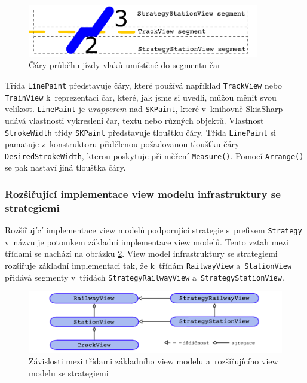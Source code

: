 \begin{figure}[!hbt]
	\includegraphics[width=0.9\textwidth]{../img/kap4_trackline_measure_solution}
	\caption{Čáry průběhu jízdy vlaků umístěné do segmentu čar}
	\label{fig:kap4:gttg-model-track-segments-solution}
\end{figure}

Třída \texttt{LinePaint} představuje čáry, které používá například \texttt{TrackView} nebo \texttt{TrainView} k~reprezentaci čar, které, jak jsme si uvedli, můžou měnit svou velikost. \texttt{LinePaint} je \textit{wrapperem} nad \texttt{SKPaint}, které v~knihovně SkiaSharp udává vlastnosti vykreslení čar, textu nebo různých objektů. Vlastnost \texttt{StrokeWidth} třídy \texttt{SKPaint} představuje tloušťku čáry. Třída \texttt{LinePaint} si pamatuje z~konstruktoru přidělenou požadovanou tloušťku čáry \texttt{DesiredStrokeWidth}, kterou poskytuje při měření \texttt{Measure()}. Pomocí \texttt{Arrange()} se pak nastaví jiná tloušťka čáry.

\subsubsection*{Rozšiřující implementace view modelu infrastruktury se strategiemi}
Rozšiřující implementace view modelů podporující strategie s~prefixem \linebreak \texttt{Strategy} v~názvu je potomkem základní implementace view modelů. Tento vztah mezi třídami se nachází na obrázku \ref{fig:kap4:gttg-core-view-model-diagram}. View model infrastruktury se strategiemi rozšiřuje základní implementaci tak, že k~třídám \texttt{RailwayView} a~\texttt{StationView} přidává segmenty v~třídách \texttt{StrategyRailwayView} a~\texttt{StrategyStationView}.

\begin{figure}[!hbt]
	\includegraphics[width=\textwidth]{../img/kap4_gttg-core-view-model-diagram}
	\caption{Závislosti mezi třídami základního view modelu a~rozšiřujícího view modelu se strategiemi}
	\label{fig:kap4:gttg-core-view-model-diagram}
\end{figure}

